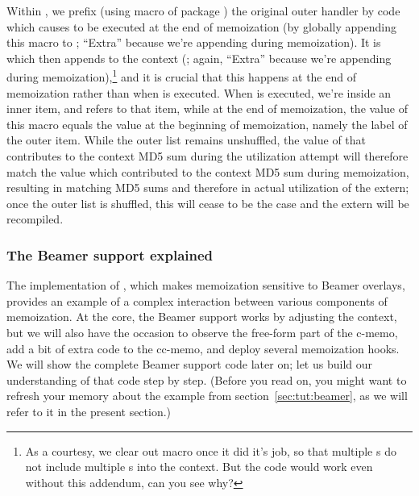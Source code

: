 \documentclass[a4paper,11pt]{article}
\begin{document}
Within , we prefix (using macro  of package
) the original outer handler  by code
which causes  to be executed at the end of memoization
(by globally appending this macro to ;
``Extra'' because we're appending during memoization).  It is
 which then appends  to the
context (; again, ``Extra'' because we're appending
during memoization),\footnote{As a courtesy, we clear out macro
   once it did it's job, so that multiple s
  do not include multiple s into the context.  But the code
  would work even without this addendum, can you see why?} and it is crucial
that this happens at the end of memoization rather than when  is
executed.  When  is executed, we're inside an inner item, and
 refers to that item, while at the end of memoization, the
value of this macro equals the value at the beginning of memoization, namely
the label of the outer item.  While the outer list remains unshuffled, the
value of  that contributes to the context MD5 sum during
the utilization attempt will therefore match the value which contributed to the
context MD5 sum during memoization, resulting in matching MD5 sums and
therefore in actual utilization of the extern; once the outer list is shuffled,
this will cease to be the case and the extern will be recompiled.


\subsubsection{The Beamer support explained}
\label{sec:per-overlay}

The implementation of , which makes memoization sensitive
to Beamer overlays, provides an example of a complex interaction between
various components of memoization.  At the core, the Beamer support works by
adjusting the context, but we will also have the occasion to observe the
free-form part of the c-memo, add a bit of extra code to the cc-memo, and
deploy several memoization hooks.  We will show the complete Beamer support
code later on; let us build our understanding of that code step by step.
(Before you read on, you might want to refresh your memory about the 
example from section~\ref{sec:tut:beamer}, as we will refer to it in the
present section.)
\end{document}

